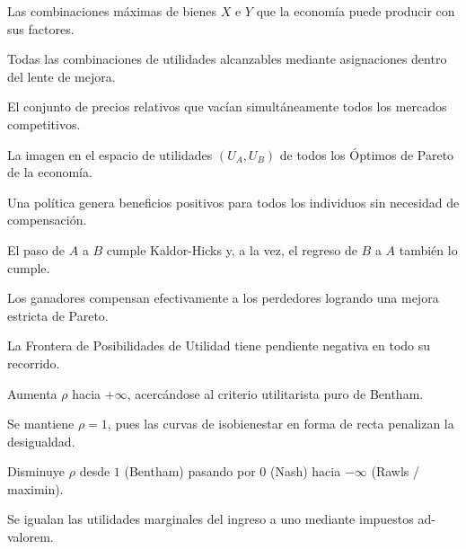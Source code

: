 \begin{opts}
    \item Las combinaciones máximas de bienes $X$ e $Y$ que la economía puede producir con sus factores.
    \item Todas las combinaciones de utilidades alcanzables mediante asignaciones dentro del lente de mejora.
    \item El conjunto de precios relativos que vacían simultáneamente todos los mercados competitivos.
    \item La imagen en el espacio de utilidades $(U_A, U_B)$ de todos los Óptimos de Pareto de la economía.
\end{opts}

\begin{opts}
    \item Una política genera beneficios positivos para todos los individuos sin necesidad de compensación.
    \item El paso de $A$ a $B$ cumple Kaldor-Hicks y, a la vez, el regreso de $B$ a $A$ también lo cumple.
    \item Los ganadores compensan efectivamente a los perdedores logrando una mejora estricta de Pareto.
    \item La Frontera de Posibilidades de Utilidad tiene pendiente negativa en todo su recorrido.
\end{opts}

\begin{opts}
    \item Aumenta $\rho$ hacia $+\infty$, acercándose al criterio utilitarista puro de Bentham.
    \item Se mantiene $\rho = 1$, pues las curvas de isobienestar en forma de recta penalizan la desigualdad.
    \item Disminuye $\rho$ desde $1$ (Bentham) pasando por $0$ (Nash) hacia $-\infty$ (Rawls / maximin).
    \item Se igualan las utilidades marginales del ingreso a uno mediante impuestos ad-valorem.
\end{opts}

